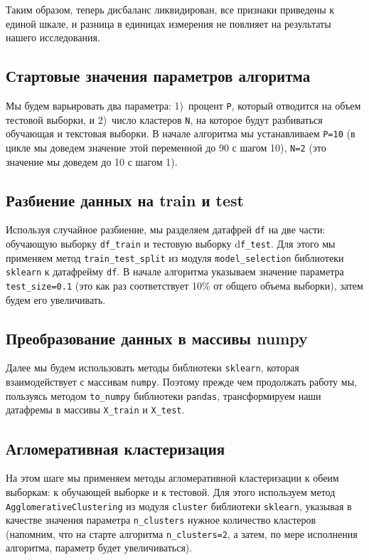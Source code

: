 \documentclass[a4paper,12pt]{article}
\begin{document}
\noindent
Таким образом, теперь дисбаланс ликвидирован, все признаки приведены к единой шкале, и разница в единицах измерения не повлияет на результаты нашего исследования.

\subsection{Стартовые значения параметров алгоритма}

Мы будем варьировать два параметра: 1)~процент \texttt{P}, который отводится на объем тестовой выборки, и 2)~число кластеров \texttt{N}, на которое будут разбиваться обучающая и текстовая выборки. В начале алгоритма мы устанавливаем \texttt{P=10} (в цикле мы доведем значение этой переменной до 90 с шагом 10), \texttt{N=2} (это значение мы доведем до 10 с шагом 1).


\subsection{Разбиение данных на train и test}

Используя случайное разбиение, мы разделяем датафрей \texttt{df} на две части: обучающую выборку \texttt{df\_train} и тестовую выборку d\texttt{f\_test}. Для этого мы применяем метод \texttt{train\_test\_split} из модуля \texttt{model\_selection} библиотеки \texttt{sklearn} к датафрейму \texttt{df}.  В начале алгоритма указываем значение параметра \texttt{test\_size=0.1} (это как раз соответствует 10\% от общего объема выборки), затем будем его увеличивать.


\subsection{Преобразование данных в массивы numpy}

Далее мы будем использовать методы библиотеки \texttt{sklearn}, которая взаимодействует с массивам \texttt{numpy}. Поэтому прежде чем продолжать работу мы, пользуясь методом \texttt{to\_numpy} библиотеки \texttt{pandas}, трансформируем наши датафремы в массивы \texttt{X\_train} и \texttt{X\_test}.

\subsection{Агломеративная кластеризация}

На этом шаге мы применяем методы агломеративной кластеризации к обеим выборкам: к обучающей выборке и к тестовой. Для этого используем метод \texttt{AgglomerativeClustering} из модуля \texttt{cluster} библиотеки \texttt{sklearn}, указывая в качестве значения параметра \texttt{n\_clusters} нужное количество кластеров (напомним, что на старте алгоритма \texttt{n\_clusters=2}, а затем, по мере исполнения алгоритма, параметр будет увеличиваться).
\end{document}
